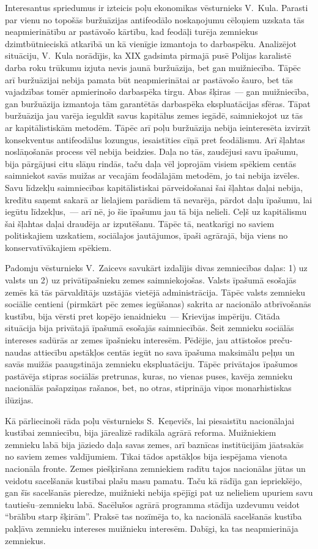 \documentclass[twoside,a5paper,12pt,fleqn,openany]{extbook}
\begin{document}
Interesantus spriedumus ir izteicis poļu ekonomikas vēsturnieks V.~Kula. Parasti par vienu no topošās buržuāzijas antifeodālo noskaņojumu cēloņiem uzskata tās neapmierinātību ar pastāvošo kārtību, kad feodāļi turēja zemniekus dzimtbūtnieciskā atkarībā un kā vienīgie izmantoja to darbaspēku. Analizējot situāciju, V.~Kula norādījis, ka XIX gadsimta pirmajā pusē Polijas karalistē darba roku trūkumu izjuta nevis jaunā buržuāzija, bet gan muižniecība. Tāpēc arī buržuāzijai nebija pamata būt neapmierinātai ar pastāvošo šauro, bet tās vajadzības tomēr apmierinošo darbaspēka tirgu. Abas šķiras~--- gan muižniecība, gan buržuāzija izmantoja tām garantētās darbaspēka ekspluatācijas sfēras. Tāpat buržuāzija jau varēja ieguldīt savus kapitālus zemes iegādē, saimniekojot uz tās ar kapitālistiskām metodēm. Tāpēc arī poļu buržuāzija nebija ieinteresēta izvirzīt konsekventus antifeodālus lozungus, iesaistīties cīņā pret feodālismu. Arī šļahtas noslāņošanās process vēl nebija beidzies. Daļa no tās, zaudējusi savu īpašumu, bija pārgājusi citu slāņu rindās, taču daļa vēl joprojām visiem spēkiem centās saimniekot savās muižas ar vecajām feodālajām metodēm, jo tai nebija izvēles. Savu līdzekļu saimniecības kapitālistiskai pārveidošanai šai šļahtas daļai nebija, kredītu saņemt sakarā ar lielajiem parādiem tā nevarēja, pārdot daļu īpašumu, lai iegūtu līdzekļus,~--- arī nē, jo šie īpašumu jau tā bija nelieli. Ceļš uz kapitālismu šai šļahtas daļai draudēja ar izputēšanu. Tāpēc tā, neatkarīgi no saviem politiskajiem uzskatiem, sociālajos jautājumos, īpaši agrārajā, bija viens no konservatīvākajiem spēkiem.

Padomju vēsturnieks V.~Zaicevs savukārt izdalījis divas zemniecības daļas: 1) uz valsts un 2) uz privātīpašnieku zemes saimniekojošas. Valsts īpašumā esošajās zemēs kā tās pārvaldītājs uzstājās vietējā administrācija. Tāpēc valsts zemnieku sociālie centieni (pirmkārt pēc zemes iegūšanas) sakrita ar nacionālo atbrīvošanās kustību, bija vērsti pret kopējo ienaidnieku~--- Krievijas impēriju. Citāda situācija bija privātajā īpašumā esošajās saimniecībās. Šeit zemnieku sociālās intereses sadūrās ar zemes īpašnieku interesēm. Pēdējie, jau attīstošos preču-naudas attiecību apstākļos centās iegūt no sava īpašuma maksimālu peļņu un savās muižās paaugstināja zemnieku ekspluatāciju. Tāpēc privātajos īpašumos pastāvēja stipras sociālās pretrunas, kuras, no vienas puses, kavēja zemnieku nacionālās pašapziņas rašanos, bet, no otras, stiprināja viņos monarhistiskas ilūzijas.

Kā pārliecinoši rāda poļu vēsturnieks S.~Keņevičs, lai piesaistītu nacionālajai kustībai zemniecību, bija jārealizē radikāla agrārā reforma. Muižniekiem zemnieku labā bija jāziedo daļa savas zemes, arī baznīcas institūcijām jāatsakās no saviem zemes valdījumiem. Tikai tādos apstākļos bija iespējama vienota nacionāla fronte. Zemes piešķiršana zemniekiem radītu tajos nacionālas jūtas un veidotu sacelšanās kustībai plašu masu pamatu. Taču kā rādīja gan iepriekšējo, gan šīs sacelšanās pieredze, muižnieki nebija spējīgi pat uz nelieliem upuriem savu tautiešu--zemnieku labā. Sacēlušos agrārā programma stādīja uzdevumu veidot ``brālību starp šķirām''. Praksē tas nozīmēja to, ka nacionālā sacelšanās kustība pakļāva zemnieku intereses muižnieku interesēm. Dabīgi, ka tas neapmierināja zemniekus.
\end{document}
